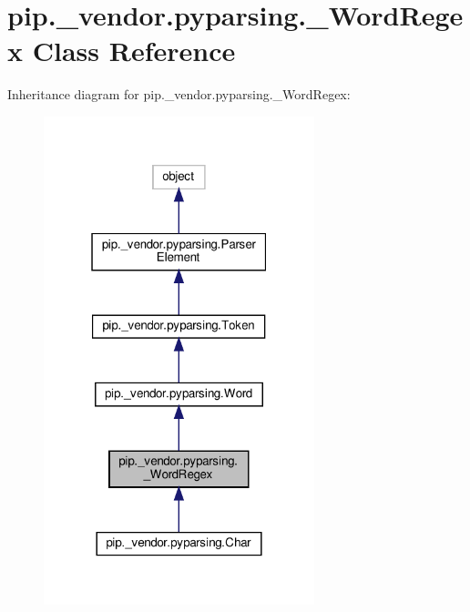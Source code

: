 \hypertarget{classpip_1_1__vendor_1_1pyparsing_1_1__WordRegex}{}\section{pip.\+\_\+vendor.\+pyparsing.\+\_\+\+Word\+Regex Class Reference}
\label{classpip_1_1__vendor_1_1pyparsing_1_1__WordRegex}


Inheritance diagram for pip.\+\_\+vendor.\+pyparsing.\+\_\+\+Word\+Regex\+:
\nopagebreak
\begin{figure}[H]
\begin{center}
\leavevmode
\includegraphics[width=223pt]{classpip_1_1__vendor_1_1pyparsing_1_1__WordRegex__inherit__graph}
\end{center}
\end{figure}


